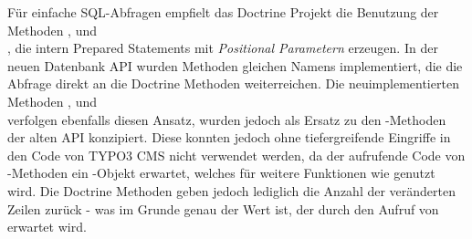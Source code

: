 Für einfache SQL-Abfragen empfielt das Doctrine Projekt die Benutzung der Methoden \phpinline{\Doctrine\DBAL\Connection\delete()}, \phpinline{\Doctrine\DBAL\Connection\update()} und\\ \phpinline{\Doctrine\DBAL\Connection\insert()}, die intern Prepared Statements mit \textit{Positional Parametern} erzeugen. In der neuen Datenbank API wurden Methoden gleichen Namens implementiert, die die Abfrage direkt an die Doctrine Methoden weiterreichen. Die neuimplementierten Methoden ,  und\\  verfolgen ebenfalls diesen Ansatz, wurden jedoch als Ersatz zu den -Methoden der alten API konzipiert. Diese konnten jedoch ohne tiefergreifende Eingriffe in den Code von TYPO3 CMS nicht verwendet werden, da der aufrufende Code von -Methoden ein -Objekt erwartet, welches für weitere Funktionen wie  genutzt wird. Die Doctrine Methoden geben jedoch lediglich die Anzahl der veränderten Zeilen zurück - was im Grunde genau der Wert ist, der durch den Aufruf von  erwartet wird.
